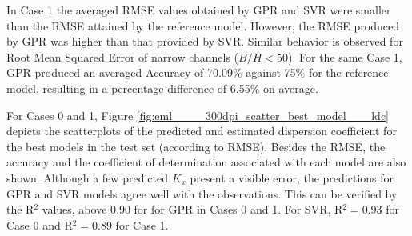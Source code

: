 \documentclass[a4paper,12pt, english]{article}
\begin{document}
In Case 1 the averaged RMSE  values obtained by GPR and SVR  were smaller than the RMSE attained by the reference model. However, the RMSE produced by GPR was higher than that provided by SVR. Similar behavior is observed for Root Mean Squared Error of narrow channels ($ B / H <50 $). For the same Case 1, GPR produced an averaged Accuracy of 70.09\% against 75\% for the reference model, resulting in a percentage difference of 6.55\% on average.  

For Cases 0 and 1,  Figure \ref{fig:eml____300dpi_scatter_best_model___ldc} depicts the scatterplots of the predicted and estimated dispersion coefficient for the best models  in the test set (according to RMSE).
Besides the RMSE, the accuracy and the coefficient of determination associated with each model are also shown. Although a few predicted $K_x$ present a visible error, the predictions for GPR and SVR models agree well with the observations. This can be verified by the R$^2$ values, above 0.90 for for GPR in Cases 0 and 1. For SVR, R$^2= 0.93$ for Case 0 and R$^2= 0.89$ for Case 1.
%
\end{document}
